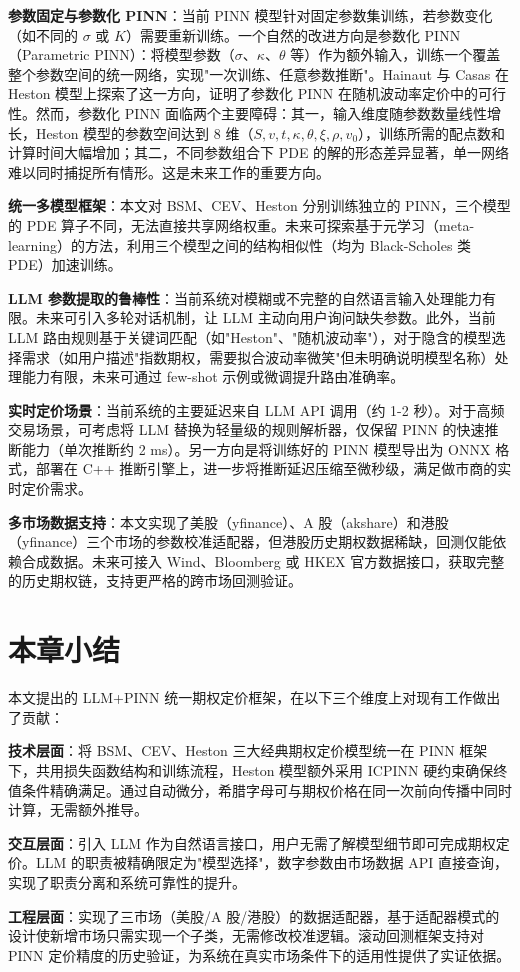 \textbf{参数固定与参数化 PINN}：当前 PINN 模型针对固定参数集训练，若参数变化（如不同的 $\sigma$ 或 $K$）需要重新训练。一个自然的改进方向是参数化 PINN（Parametric PINN）：将模型参数（$\sigma$、$\kappa$、$\theta$ 等）作为额外输入，训练一个覆盖整个参数空间的统一网络，实现"一次训练、任意参数推断"。Hainaut 与 Casas\citep{hainaut2024heston} 在 Heston 模型上探索了这一方向，证明了参数化 PINN 在随机波动率定价中的可行性。然而，参数化 PINN 面临两个主要障碍：其一，输入维度随参数数量线性增长，Heston 模型的参数空间达到 8 维（$S, v, t, \kappa, \theta, \xi, \rho, v_0$），训练所需的配点数和计算时间大幅增加；其二，不同参数组合下 PDE 的解的形态差异显著，单一网络难以同时捕捉所有情形。这是未来工作的重要方向。

\textbf{统一多模型框架}：本文对 BSM、CEV、Heston 分别训练独立的 PINN，三个模型的 PDE 算子不同，无法直接共享网络权重。未来可探索基于元学习（meta-learning）的方法，利用三个模型之间的结构相似性（均为 Black-Scholes 类 PDE）加速训练。

\textbf{LLM 参数提取的鲁棒性}：当前系统对模糊或不完整的自然语言输入处理能力有限。未来可引入多轮对话机制，让 LLM 主动向用户询问缺失参数。此外，当前 LLM 路由规则基于关键词匹配（如"Heston"、"随机波动率"），对于隐含的模型选择需求（如用户描述"指数期权，需要拟合波动率微笑"但未明确说明模型名称）处理能力有限，未来可通过 few-shot 示例或微调提升路由准确率。

\textbf{实时定价场景}：当前系统的主要延迟来自 LLM API 调用（约 1-2 秒）。对于高频交易场景，可考虑将 LLM 替换为轻量级的规则解析器，仅保留 PINN 的快速推断能力（单次推断约 2 ms）。另一方向是将训练好的 PINN 模型导出为 ONNX 格式，部署在 C++ 推断引擎上，进一步将推断延迟压缩至微秒级，满足做市商的实时定价需求。

\textbf{多市场数据支持}：本文实现了美股（yfinance）、A 股（akshare）和港股（yfinance）三个市场的参数校准适配器，但港股历史期权数据稀缺，回测仅能依赖合成数据。未来可接入 Wind、Bloomberg 或 HKEX 官方数据接口，获取完整的历史期权链，支持更严格的跨市场回测验证。

\section{本章小结}\label{sec:conclusion_summary}

本文提出的 LLM+PINN 统一期权定价框架，在以下三个维度上对现有工作做出了贡献：

\textbf{技术层面}：将 BSM、CEV、Heston 三大经典期权定价模型统一在 PINN 框架下，共用损失函数结构和训练流程，Heston 模型额外采用 ICPINN 硬约束确保终值条件精确满足。通过自动微分，希腊字母可与期权价格在同一次前向传播中同时计算，无需额外推导。

\textbf{交互层面}：引入 LLM 作为自然语言接口，用户无需了解模型细节即可完成期权定价。LLM 的职责被精确限定为"模型选择"，数字参数由市场数据 API 直接查询，实现了职责分离和系统可靠性的提升。

\textbf{工程层面}：实现了三市场（美股/A 股/港股）的数据适配器，基于适配器模式的设计使新增市场只需实现一个子类，无需修改校准逻辑。滚动回测框架支持对 PINN 定价精度的历史验证，为系统在真实市场条件下的适用性提供了实证依据。
